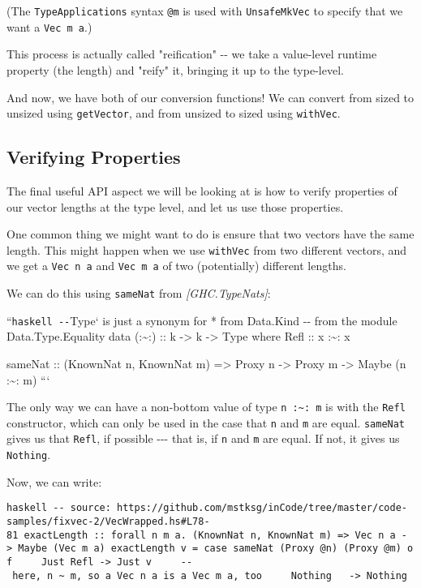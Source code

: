 \documentclass[]{article}
\begin{document}
(The \texttt{TypeApplications} syntax \texttt{@m} is used with
\texttt{UnsafeMkVec} to specify that we want a \texttt{Vec\ m\ a}.)

This process is actually called "reification" -\/- we take a value-level runtime
property (the length) and "reify" it, bringing it up to the type-level.

And now, we have both of our conversion functions! We can convert from sized to
unsized using \texttt{getVector}, and from unsized to sized using
\texttt{withVec}.

\subsection{Verifying Properties}

The final useful API aspect we will be looking at is how to verify properties of
our vector lengths at the type level, and let us use those properties.

One common thing we might want to do is ensure that two vectors have the same
length. This might happen when we use \texttt{withVec} from two different
vectors, and we get a \texttt{Vec\ n\ a} and \texttt{Vec\ m\ a} of two
(potentially) different lengths.

We can do this using \texttt{sameNat} from \emph{{[}GHC.TypeNats{]}}:

``\texttt{haskell\ -\/-}Type` is just a synonym for * from Data.Kind -\/- from
the module Data.Type.Equality data (:\textasciitilde{}:) :: k -\textgreater{} k
-\textgreater{} Type where Refl :: x :\textasciitilde{}: x

sameNat :: (KnownNat n, KnownNat m) =\textgreater{} Proxy n -\textgreater{}
Proxy m -\textgreater{} Maybe (n :\textasciitilde{}: m) ```

The only way we can have a non-bottom value of type
\texttt{n\ :\textasciitilde{}:\ m} is with the \texttt{Refl} constructor, which
can only be used in the case that \texttt{n} and \texttt{m} are equal.
\texttt{sameNat} gives us that \texttt{Refl}, if possible -\/-\/- that is, if
\texttt{n} and \texttt{m} are equal. If not, it gives us \texttt{Nothing}.

Now, we can write:

\texttt{haskell\ -\/-\ source:\ https://github.com/mstksg/inCode/tree/master/code-samples/fixvec-2/VecWrapped.hs\#L78-81\ exactLength\ ::\ forall\ n\ m\ a.\ (KnownNat\ n,\ KnownNat\ m)\ =\textgreater{}\ Vec\ n\ a\ -\textgreater{}\ Maybe\ (Vec\ m\ a)\ exactLength\ v\ =\ case\ sameNat\ (Proxy\ @n)\ (Proxy\ @m)\ of\ \ \ \ \ Just\ Refl\ -\textgreater{}\ Just\ v\ \ \ \ \ -\/-\ here,\ n\ \textasciitilde{}\ m,\ so\ a\ \textasciigrave{}Vec\ n\ a\textasciigrave{}\ is\ a\ \textasciigrave{}Vec\ m\ a\textasciigrave{},\ too\ \ \ \ \ Nothing\ \ \ -\textgreater{}\ Nothing}
\end{document}
